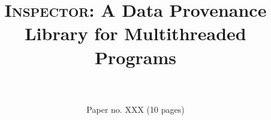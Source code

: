 \documentclass{IEEEtran}
\newcommand{\projecttitle}{\textsc{Inspector}\xspace}
\newcommand{\intelpt}{{Intel\textsuperscript{\textregistered} PT}\xspace}
\begin{document}
\author{
\\
\\
Paper no. XXX (10 pages)
}

\title{\Large \projecttitle: A Data Provenance Library for Multithreaded Programs}%
\maketitle















 
\end{document}
